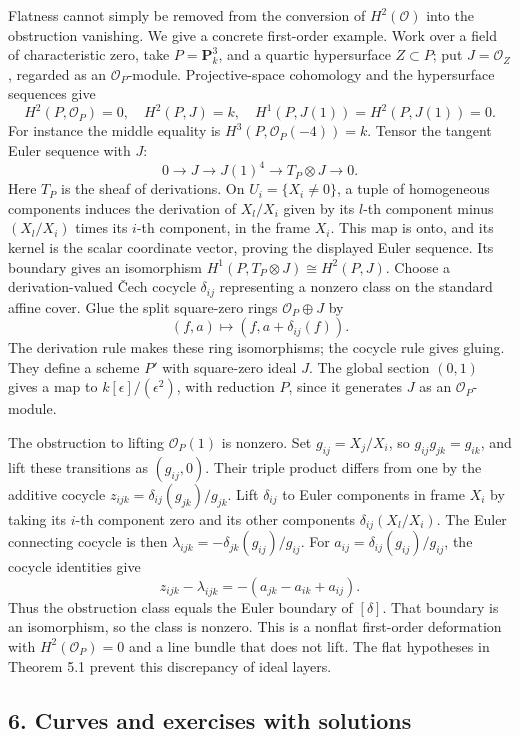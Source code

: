 \documentclass[11pt]{article}
\begin{document}
Flatness cannot simply be removed from the conversion of
\(H^2(\mathcal O)\) into the obstruction vanishing. We give a concrete
first-order example. Work over a field of characteristic zero, take
\(P=\mathbf P^3_k\), and a quartic hypersurface \(Z\subset P\); put
\(J=\mathcal O_Z\), regarded as an \(\mathcal O_P\)-module.
Projective-space cohomology and the hypersurface sequences give \[
H^2(P,\mathcal O_P)=0,\quad H^2(P,J)=k,
\quad H^1(P,J(1))=H^2(P,J(1))=0.
\] For instance the middle equality is \(H^3(P,\mathcal O_P(-4))=k\).
Tensor the tangent Euler sequence with \(J\): \[
0\to J\to J(1)^4\to T_P\otimes J\to0.
\] Here \(T_P\) is the sheaf of derivations. On \(U_i=\{X_i\neq0\}\), a
tuple of homogeneous components induces the derivation of \(X_l/X_i\)
given by its \(l\)-th component minus \((X_l/X_i)\) times its \(i\)-th
component, in the frame \(X_i\). This map is onto, and its kernel is the
scalar coordinate vector, proving the displayed Euler sequence. Its
boundary gives an isomorphism \(H^1(P,T_P\otimes J)\cong H^2(P,J)\).
Choose a derivation-valued Čech cocycle \(\delta_{ij}\) representing a
nonzero class on the standard affine cover. Glue the split square-zero
rings \(\mathcal O_P\oplus J\) by \[
(f,a)\longmapsto(f,a+\delta_{ij}(f)).
\] The derivation rule makes these ring isomorphisms; the cocycle rule
gives gluing. They define a scheme \(P'\) with square-zero ideal \(J\).
The global section \((0,1)\) gives a map to
\(k[\epsilon]/(\epsilon^2)\), with reduction \(P\), since it generates
\(J\) as an \(\mathcal O_P\)-module.

The obstruction to lifting \(\mathcal O_P(1)\) is nonzero. Set
\(g_{ij}=X_j/X_i\), so \(g_{ij}g_{jk}=g_{ik}\), and lift these
transitions as \((g_{ij},0)\). Their triple product differs from one by
the additive cocycle \(z_{ijk}=\delta_{ij}(g_{jk})/g_{jk}\). Lift
\(\delta_{ij}\) to Euler components in frame \(X_i\) by taking its
\(i\)-th component zero and its other components
\(\delta_{ij}(X_l/X_i)\). The Euler connecting cocycle is then
\(\lambda_{ijk}=-\delta_{jk}(g_{ij})/g_{ij}\). For
\(a_{ij}=\delta_{ij}(g_{ij})/g_{ij}\), the cocycle identities give \[
z_{ijk}-\lambda_{ijk}=-(a_{jk}-a_{ik}+a_{ij}).
\] Thus the obstruction class equals the Euler boundary of \([\delta]\).
That boundary is an isomorphism, so the class is nonzero. This is a
nonflat first-order deformation with \(H^2(\mathcal O_P)=0\) and a line
bundle that does not lift. The flat hypotheses in Theorem 5.1 prevent
this discrepancy of ideal layers.

\subsection{6. Curves and exercises with
solutions}\label{curves-and-exercises-with-solutions}
\end{document}
